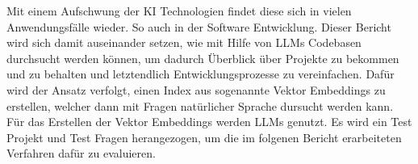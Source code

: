 \documentclass[../main.tex]{subfiles}
\begin{document}
Mit einem Aufschwung der KI Technologien findet diese sich in vielen Anwendungsfälle wieder.
So auch in der Software Entwicklung.
Dieser Bericht wird sich damit auseinander setzen, wie mit Hilfe von \glspl{LLM} Codebasen durchsucht werden können, um dadurch Überblick über Projekte zu bekommen und zu behalten und letztendlich Entwicklungsprozesse zu vereinfachen.
Dafür wird der Ansatz verfolgt, einen Index aus sogenannte Vektor Embeddings zu erstellen, welcher dann mit Fragen natürlicher Sprache dursucht werden kann.
Für das Erstellen der Vektor Embeddings werden \glspl{LLM} genutzt.
Es wird ein Test Projekt und Test Fragen herangezogen, um die im folgenen Bericht erarbeiteten Verfahren dafür zu evaluieren.
\end{document}
